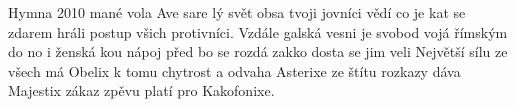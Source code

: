 \begin{TEXT}{Hymna 2010}
\SLOKA {}mané vola Ave sare \NL
{}lý svět obsa tvoji jovníci\NL
{}vědí co je kat se zdarem \NL
{}hráli postup všich protivníci. 
\REFREN  Vzdále galská  vesni je svobod \NL
vojá římským  do no i ženská \NL
kou nápoj  před bo se rozdá\NL
zakko dosta se jim  veli
\SLOKA Největší sílu ze všech má Obelix \NL
k tomu chytrost a odvaha Asterixe\NL
ze štítu rozkazy dáva Majestix\NL
zákaz zpěvu platí pro Kakofonixe. 
\REFREN 
\end{TEXT}
